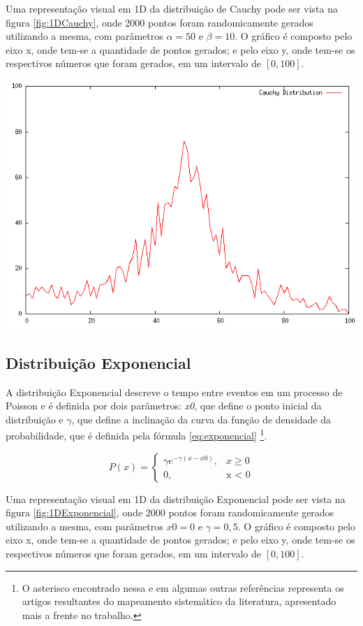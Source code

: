 Uma representação visual em 1D da distribuição de Cauchy pode ser vista na figura \ref{fig:1DCauchy}, onde 2000 pontos foram randomicamente gerados utilizando a mesma, com parâmetros $\alpha = 50$ e $\beta = 10$. O gráfico é composto pelo eixo x, onde tem-se a quantidade de pontos gerados; e pelo eixo y, onde tem-se os respectivos números que foram gerados, em um intervalo de $[0, 100]$.

{
    \centering
    \includegraphics[width=0.5\linewidth]{figuras/DistribuicaoCauchy.png}
    \label{fig:1DCauchy}
}

\subsection{Distribuição Exponencial}

A distribuição Exponencial descreve o tempo entre eventos em um processo de Poisson e é definida por dois parâmetros: \textit{x0}, que define o ponto inicial da distribuição e $\gamma$, que define a inclinação da curva da função de densidade da probabilidade, que é definida pela fórmula \ref{eq:exponencial} \cite{yu} \footnote{O asterisco encontrado nessa e em algumas outras referências representa os artigos resultantes do mapeamento sistemático da literatura, apresentado mais a frente no trabalho.}.

\begin{equation}
\label{eq:exponencial}
P(x) = 
\begin{cases}
	\gamma e^{-\gamma(x-x0)},    & \text{$x \geq 0$}\\
    0, & \text{x < 0}
\end{cases}
\end{equation}

Uma representação visual em 1D da distribuição Exponencial pode ser vista na figura \ref{fig:1DExponencial}, onde 2000 pontos foram randomicamente gerados utilizando a mesma, com parâmetros $x0 = 0$ e $\gamma = 0,5$. O gráfico é composto pelo eixo x, onde tem-se a quantidade de pontos gerados; e pelo eixo y, onde tem-se os respectivos números que foram gerados, em um intervalo de $[0, 100]$.

